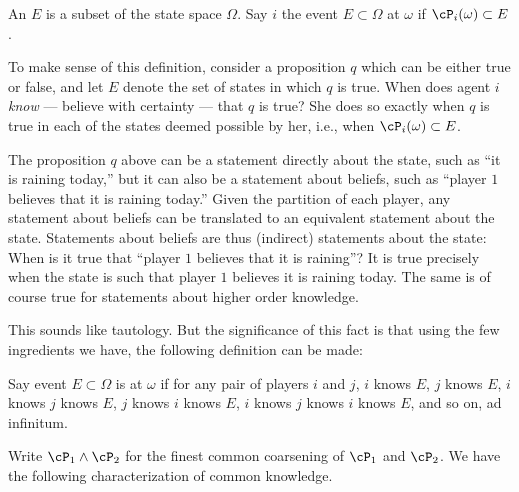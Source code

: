 \begin{definition}
  An  \(E\) is a subset of the state space \(\Omega\).
  Say \(i\)  the event \(E \subset \Omega\) at \(\omega\) if \(\cP_i(\omega) \subset E\).
\end{definition}

To make sense of this definition, consider a proposition \(q\) which can be either true or false, and let \(E\) denote the set of states in which \(q\) is true.
When does agent \(i\) \emph{know} --- believe with certainty --- that \(q\) is true?
She does so exactly when \(q\) is true in each of the states deemed possible by her, i.e., when \(\cP_i(\omega) \subset E\).

The proposition \(q\) above can be a statement directly about the state, such as ``it is raining today,'' but it can also be a statement about beliefs, such as ``player \(1\) believes that it is raining today.''
Given the partition of each player, any statement about beliefs can be translated to an equivalent statement about the state.
Statements about beliefs are thus (indirect) statements about the state:
When is it true that ``player \(1\) believes that it is raining''?
It is true precisely when the state is such that player \(1\) believes it is raining today.
The same is of course true for statements about higher order knowledge.

This sounds like tautology.
But the significance of this fact is that using the few ingredients we have, the following definition can be made:
\begin{definition}
  Say event \(E \subset \Omega\) is  at \(\omega\) if for any pair of players \(i\) and \(j\), \(i\) knows \(E\), \(j\) knows \(E\), \(i\) knows \(j\) knows \(E\), \(j\) knows \(i\) knows \(E\), \(i\) knows \(j\) knows \(i\) knows \(E\), and so on, ad infinitum.
\end{definition}


Write \(\cP_1 \wedge \cP_2\) for the finest common coarsening of \(\cP_1\) and \(\cP_2\).
We have the following characterization of common knowledge.

